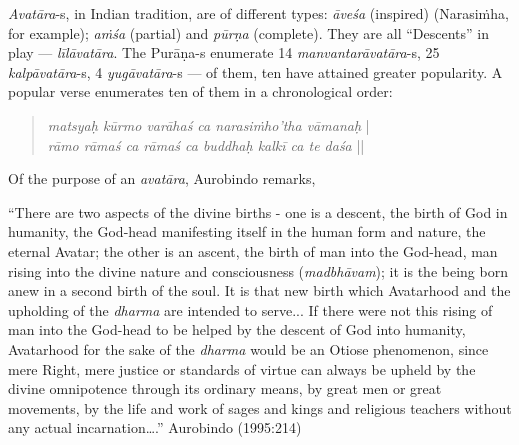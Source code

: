{\sl Avatāra}-s, in Indian tradition, are of different types: {\sl āveśa} (inspired) (Narasiṁha, for example); {\sl aṁśa} (partial) and {\sl pūrṇa} (complete). They are all “Descents” in play --- {\sl līlāvatāra}. The Purāṇa-s enumerate 14 {\sl manvantarāvatāra}-s, 25 {\sl kalpāvatāra}-s, 4 {\sl yugāvatāra}-s --- of them, ten have attained greater popularity. A popular verse enumerates ten of them in a chronological order:

\begin{quote}
{{\sl matsyaḥ kūrmo varāhaś ca narasiṁho’tha vāmanaḥ}} |\\
{\sl rāmo rāmaś ca rāmaś ca buddhaḥ kalkī ca te daśa} ||
\end{quote}

Of the purpose of an {\sl avatāra}, Aurobindo remarks, 

\begin{myquote}
“There are two aspects of the divine births - one is a descent, the birth of God in humanity, the God-head manifesting itself in the human form and nature, the eternal Avatar; the other is an ascent, the birth of man into the God-head, man rising into the divine nature and consciousness ({\sl madbhāvam}); it is the being born anew in a second birth of the soul. It is that new birth which Avatarhood and the upholding of the {\sl dharma} are intended to serve... If there were not this rising of man into the God-head to be helped by the descent of God into humanity, Avatarhood for the sake of the {\sl dharma} would be an Otiose phenomenon, since mere Right, mere justice or standards of virtue can always be upheld by the divine omnipotence through its ordinary means, by great men or great movements, by the life and work of sages and kings and religious teachers without any actual incarnation….”
\hfill Aurobindo (1995:214)
\end{myquote}

